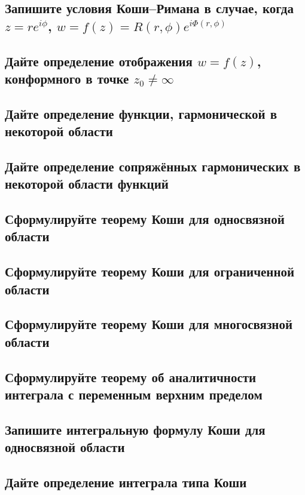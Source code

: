 \subsection{Запишите условия Коши–Римана в случае, когда $z = re^{i\phi}$, $w = f(z) = R(r,\phi)e^{i\Phi(r,\phi)}$}

\subsection{Дайте определение отображения $w = f(z)$, конформного в точке $z_0 \neq \infty$}

\subsection{Дайте определение функции, гармонической в некоторой области}

\subsection{Дайте определение сопряжённых гармонических в некоторой области функций}

\subsection{Сформулируйте теорему Коши для односвязной области}

\subsection{Сформулируйте теорему Коши для ограниченной области}

\subsection{Сформулируйте теорему Коши для многосвязной области}

\subsection{Сформулируйте теорему об аналитичности интеграла с переменным верхним пределом}

\subsection{Запишите интегральную формулу Коши для односвязной области}

\subsection{Дайте определение интеграла типа Коши}

